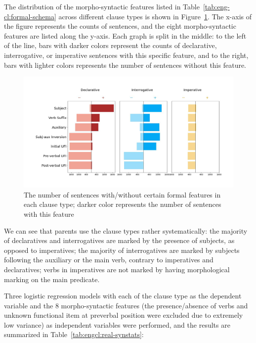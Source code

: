 The distribution of the morpho-syntactic features listed in Table~\ref{tab:eng-cl:formal-schema} across different clause types is shown in Figure~\ref{fig:real-syncluster}. The x-axis of the figure represents the counts of sentences, and the eight morpho-syntactic features are listed along the y-axis. Each graph is split in the middle: to the left of the line, bars with darker colors represent the counts of declarative, interrogative, or imperative sentences with this specific feature, and to the right, bars with lighter colors represents the number of sentences without this feature. 





\begin{figure}[H]
    \centering
    \includegraphics[width=1\textwidth]{figures/real-syncluster.jpg}
    \caption{The number of sentences with/without certain formal features in each clause type; darker color represents the number of sentences with this feature }
    \label{fig:real-syncluster}
\end{figure}

We can see that parents use the clause types rather systematically: the majority of declaratives and interrogatives are marked by the presence of subjects, as opposed to imperatives; the majority of interrogatives are marked by subjects following the auxiliary or the main verb, contrary to imperatives and declaratives; verbs in imperatives are not marked by having morphological marking on the main predicate. 

Three logistic regression models with each of the clause type as the dependent variable and the 8 morpho-syntactic features (the presence/absence of verbs and unknown functional item at preverbal position were excluded due to extremely low variance) as independent variables were performed, and the results are summarized in Table~\ref{tab:engcl:real-synstats}:


